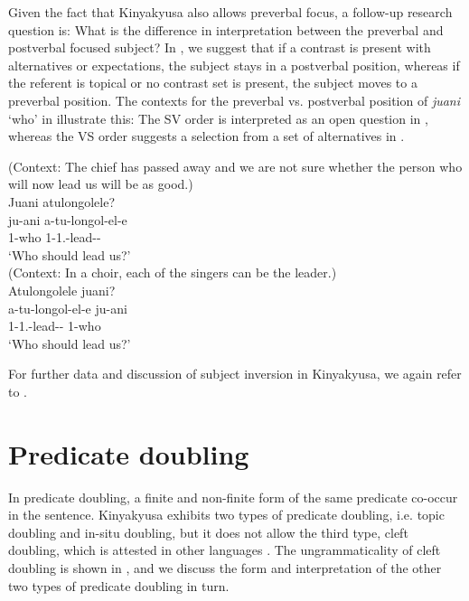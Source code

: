 \documentclass[output=paper]{langscibook}
\begin{document}
\z


Given the fact that Kinyakyusa also allows preverbal focus, a follow-up research question is: What is the difference in interpretation between the preverbal and postverbal focused subject? In \citet{MsovelaEtAl2023}, we suggest that if a contrast is present with alternatives or expectations, the subject stays in a postverbal position, whereas if the referent is topical or no contrast set is present, the subject moves to a preverbal position. The contexts for the preverbal vs. postverbal position of \textit{juani} ‘who’ in  illustrate this: The SV order is interpreted as an open question in , whereas the VS order suggests a selection from a set of alternatives in .

\ea
\label{bkm:Ref122427381}
\ea
\label{bkm:Ref122427381:a}
(Context: The chief has passed away and we are not sure whether the person who will now lead us will be as good.)\\
Juani atulongolele?\\
\gll
ju-ani  a-tu-longol-el-e\\
1-who  1\SM{}-1\PL.\OM{}-lead-\APPL-\SBJV{}\\
\glt
‘Who should lead us?’\\


\ex
\label{bkm:Ref122427381:b}
(Context: In a choir, each of the singers can be the leader.)\\
Atulongolele juani?\\
\gll
a-tu-longol-el-e  ju-ani\\
1\SM{}-1\PL.\OM{}-lead-\APPL{}-\SBJV{}  1-who\\
\glt
‘Who should lead us?’ \citep[173]{MsovelaEtAl2023}\\

\z
\z

For further data and discussion of subject inversion in Kinyakyusa, we again refer to \citet{MsovelaEtAl2023}.

\section{Predicate doubling}
\label{bkm:Ref114648496}
In predicate doubling, a finite and non-finite form of the same predicate co-occur in the sentence. Kinyakyusa exhibits two types of predicate doubling, i.e. topic doubling and in-situ doubling, but it does not allow the third type, cleft doubling, which is attested in other languages \citep{GüldemannFiedler2022}. The ungrammaticality of cleft doubling is shown in , and we discuss the form and interpretation of the other two types of predicate doubling in turn.
\end{document}

